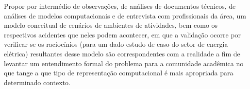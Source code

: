 Propor por intermédio de observações, de análises de documentos técnicos, de análises de modelos computacionais e de entrevista com profissionais da área, um modelo conceitual de cenários de ambientes de atividades, bem como os respectivos acidentes que neles podem acontecer, em que a validação ocorre por verificar se os raciocínios (para um dado estudo de caso do setor de energia elétrica) resultantes desse modelo são correspondentes com a realidade a fim de levantar um entendimento formal do problema para a comunidade acadêmica no que tange a que tipo de representação computacional é mais apropriada para determinado contexto. 